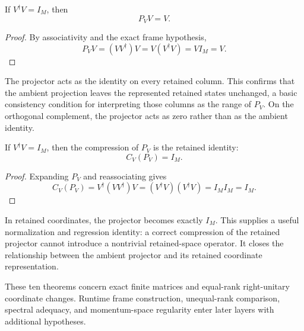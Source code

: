 \begin{theorem}
\label{thm:bg-alignment-009}
If $V^\dagger V=I_M$, then
\[
  P_VV=V.
\]
\end{theorem}

\begin{proof}
By associativity and the exact frame hypothesis,
\[
  P_VV=(VV^\dagger)V=V(V^\dagger V)=VI_M=V.
\]
\end{proof}

The projector acts as the identity on every retained column. This confirms that the
ambient projection leaves the represented retained states unchanged, a basic
consistency condition for interpreting those columns as the range of $P_V$. On the orthogonal
complement, the projector acts as zero rather than as the ambient identity.

\begin{theorem}
\label{thm:bg-alignment-010}
If $V^\dagger V=I_M$, then the compression of $P_V$ is the retained identity:
\[
  C_V(P_V)=I_M.
\]
\end{theorem}

\begin{proof}
Expanding $P_V$ and reassociating gives
\[
  C_V(P_V)
  =V^\dagger(VV^\dagger)V
  =(V^\dagger V)(V^\dagger V)
  =I_MI_M=I_M.
\]
\end{proof}

In retained coordinates, the projector becomes exactly $I_M$. This supplies a useful
normalization and regression identity: a correct compression of the retained projector
cannot introduce a nontrivial retained-space operator. It closes the relationship
between the ambient projector and its retained coordinate representation.

\begin{remark}
These ten theorems concern exact finite matrices and equal-rank right-unitary coordinate
changes. Runtime frame construction, unequal-rank comparison, spectral adequacy, and
momentum-space regularity enter later layers with additional hypotheses.
\end{remark}
